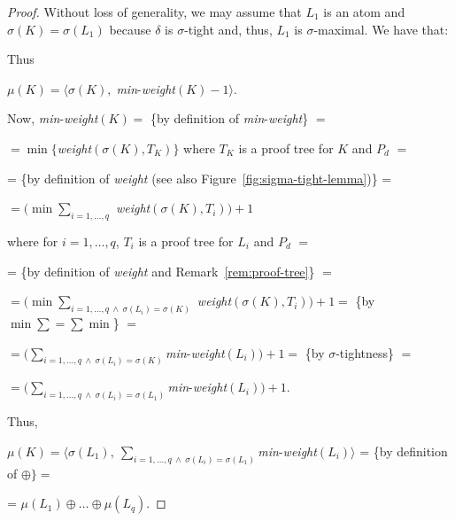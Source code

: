\documentclass[english]{tlp}
\begin{document}
\begin{proof}  Without loss of generality, we may assume that $L_1$ is an atom and $\sigma(K)=\sigma(L_1)$ because $\delta$ is $\sigma$-tight
and, thus, $L_1$ is $\sigma$-maximal. We have that:

\noindent
Thus

\smallskip
 $\mu(K)=\langle \sigma(K), \;${\it min}-{\it weight}$(K)\!-\!1\rangle$.

\smallskip
\noindent
Now, {\it min}-{\it weight}$(K) =$ \{by definition of 
{\it min}-{\it weight}\} $= $

\smallskip \indent
$= \min \{${\it weight}$(\sigma(K),T_K)\}$ where $T_K$ is a 
proof tree for $K$ and $P_d$ $=$

\smallskip \indent
= \{by definition of {\it weight} (see also Figure~\ref{fig:sigma-tight-lemma})\} =

\smallskip \indent
$= \big(\!\min \sum_{i=1,\ldots,q}$ {\it weight}$(\sigma(K),T_i)\!\big)\!+\!1$ 

\smallskip 
\makebox[20mm][l]{}where for $i\!=\!1,\ldots,q$, $T_i$ is a proof tree for $L_i$ and $P_d$ $=$


\smallskip \indent
= \{by definition of {\it weight} and Remark~\ref{rem:proof-tree}\} $=$

\smallskip \indent
$= \big(\!\min \sum_{i=1,\ldots,q\ \wedge\ \sigma(L_i)=\sigma(K)}$ 
{\it weight}$(\sigma(K),T_i)\!\big)\!+\!1=$  \{by $\min \sum  = \sum \min$\} $=$

\medskip \indent 
$= \big(\!\sum_{i=1,\ldots,q\ \wedge\ \sigma(L_i)=\sigma(K)} 
${\it min}-{\it weight}$(L_i)\!\big)\!+\!1=$  \{by $\sigma$-tightness\} $=$


\medskip \indent 
$= \big(\!\sum_{i=1,\ldots,q\ \wedge\ \sigma(L_i)=\sigma(L_1)} 
${\it min}-{\it weight}$(L_i)\!\big)\!+\!1$.

\smallskip\noindent 
Thus, 

\smallskip\noindent 
$\mu(K)=\langle \sigma(L_1),\ \sum_{i=1,\ldots,q\ \wedge\ \sigma(L_i)=\sigma(L_1)} 
${\it min}-{\it weight}$(L_i)\rangle$ = \{by definition of $\oplus\} =$

\smallskip \indent 
= $\mu(L_1)\oplus \ldots \oplus \mu(L_q)$.
\end{proof}
\end{document}
